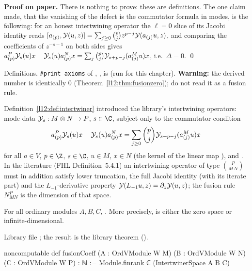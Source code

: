 \textbf{Proof on paper.} There is nothing to prove: these are definitions. The one claim made, that the vanishing of the defect is the commutator formula in modes,
is the following: for an honest intertwining operator the $\ell=0$ slice of its Jacobi identity reads
$[a_{(p)},\mathcal{Y}(u,z)] = \sum_{j\ge0}\binom pj z^{p-j}\mathcal{Y}(a_{(j)}u,z)$, and comparing the coefficients of $z^{-s-1}$ on both sides gives
$a^P_{(p)}\mathcal{Y}_s(u)x - \mathcal{Y}_s(u)a^N_{(p)}x = \sum_j\binom pj\mathcal{Y}_{s+p-j}(a^M_{(j)}u)x$, i.e.\ $\Delta = 0$. \qed

\begin{status}
Definitions. \texttt{\#print axioms} of , ,  is
\lean{[propext, Classical.}\allowbreak{}\allowbreak\lean{sound]} (run for this chapter). \textbf{Warning:}
the derived number  is identically $0$ (Theorem~\ref{l12:thm:fusionzero}); do not read it as a fusion rule.
\end{status}

Definition~\ref{l12:def:intertwiner} introduced the library's intertwining operators: mode data
$\mathcal{Y}_s:M\otimes N\to P$, $s\in\C$, subject only to the commutator condition
\begin{equation*}
 a^P_{(p)}\mathcal{Y}_s(u)x - \mathcal{Y}_s(u)a^N_{(p)}x = \sum_{j\ge0}\binom pj\mathcal{Y}_{s+p-j}(a^M_{(j)}u)x
\end{equation*}
for all $a\in V$, $p\in\Z$, $s\in\C$, $u\in M$, $x\in N$ (the kernel  of the linear map
), and . In the
literature (FHL Definition~5.4.1) an intertwining operator of type $\binom{P}{M\,N}$ must in addition satisfy lower
truncation, the full Jacobi identity (with its iterate part) and the $L_{-1}$-derivative property
$\mathcal{Y}(L_{-1}u,z) = \partial_z\mathcal{Y}(u,z)$; the fusion rule $N_{MN}^P$ is the dimension of that space.

\begin{theorem}\label{l12:thm:fusionzero}
For all ordinary modules $A,B,C$, . More precisely,  is either
the zero space or infinite-dimensional.
\end{theorem}
\noindent Library file ; the result is the library theorem
\allowbreak{}\allowbreak{}\allowbreak{} ().
\begin{leancode}
noncomputable def fusionCoeff (A : OrdVModule W M) (B : OrdVModule W N) (C : OrdVModule W P) : ℕ :=
  Module.finrank ℂ (IntertwinerSpace A B C)
\end{leancode}


